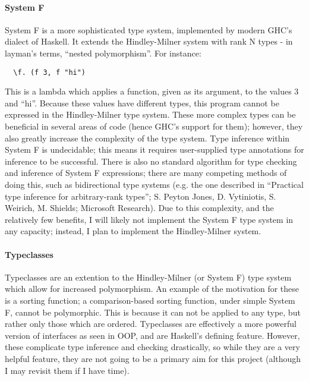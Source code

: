 \documentclass[9pt]{extarticle}
\begin{document}
\paragraph{System F}

System F is a more sophisticated type system, implemented by modern GHC's
dialect of Haskell. It extends the Hindley-Milner system with rank N types - in
layman's terms, ``nested polymorphism''. For instance:

\begin{verbatim}
  \f. (f 3, f "hi")
\end{verbatim}

This is a lambda which applies a function, given as its argument, to the values
3 and ``hi''. Because these values have different types, this program cannot be
expressed in the Hindley-Milner type system. These more complex types can be
beneficial in several areas of code (hence GHC's support for them); however,
they also greatly increase the complexity of the type system. Type inference
within System F is undecidable; this means it requires user-supplied type
annotations for inference to be successful. There is also no standard algorithm
for type checking and inference of System F expressions; there are many
competing methods of doing this, such as bidirectional type systems (e.g. the
one described in ``Practical type inference for arbitrary-rank types''; S. Peyton
Jones, D. Vytiniotis, S. Weirich, M. Shields; Microsoft Research). Due to this
complexity, and the relatively few benefits, I will likely not implement the
System F type system in any capacity; instead, I plan to implement the
Hindley-Milner system.

\paragraph{Typeclasses}

Typeclasses are an extention to the Hindley-Milner (or System F) type system
which allow for increased polymorphism. An example of the motivation for these
is a sorting function; a comparison-based sorting function, under simple System
F, cannot be polymorphic. This is because it can not be applied to any type, but
rather only those which are ordered. Typeclasses are effectively a more powerful
version of interfaces as seen in OOP, and are Haskell's defining feature.
However, these complicate type inference and checking drastically, so while they
are a very helpful feature, they are not going to be a primary aim for this
project (although I may revisit them if I have time).
\end{document}
